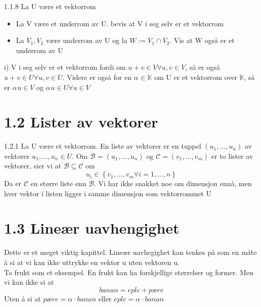 \documentclass[a4paper,norsk]{article}
\begin{document}
\begin{oppgavebox}{1.1.8}{}
La U være et vektorrom
\begin{itemize}
    \item La V være et underrom av U. bevis at V i seg selv er et vektorrom
    \item La $ V_1, V_2 $ være underrom av U og la $ W := V_1 \cap V_2 $. Vis at W også er et underrom av U   
\end{itemize}

\begin{proofbox}{i)}{}
V i seg selv er et vektorrom fordi om $ u + v \in V  \forall u, v \in V$, så er også $ u + v \in U \forall u, v \in U $. Videre er også for en $ \alpha_{}^{} \in  \mathbb{K} $ om U er et vektorrom over $ \mathbb{K} $, så er $ \alpha_{}^{} u \in V  $ og $ \alpha_{}^{} u \in U \forall u \in  V$  
\end{proofbox}
\end{oppgavebox}


\section*{1.2 Lister av vektorer}

\begin{definitionbox}{1.2.1}{}
La U være et vektorrom. En liste av vektorer er en tuppel $ \left( u_1, ..., u_n \right)  $ av vektorer $ u_1, ..., u_n \in U $. Om $ \mathcal{B}= \left( u_1, ..., u_n \right)  $ og $ \mathcal{C} = \left( v_1, ..., v_m \right)  $ er to lister av vektorer, sier vi at $ \mathcal{B} \subseteq \mathcal{C} $ om 
\[
    u_i \in \left\{ v_1, ..., v_m  \forall i = 1, ..., n \right\} 
\]
Da er $ \mathcal{C} $ en større liste enn $ \mathcal{B} $. Vi har ikke snakket noe om dimensjon ennå, men hver vektor i listen ligger i samme dimensjon som vektorrommet U
\end{definitionbox}

\section*{1.3 Lineær uavhengighet}

Dette er et meget viktig kapittel. Lineær uavhegighet kan tenkes på som en måte å si at vi kan ikke uttrykke en vektor u uten vektoren u.\\

Ta frukt som et eksempel. En frukt kan ha forskjellige størrelser og former. Men vi kan ikke si at 
\[
    banan = eple + pære
\]
Uten å si at $ pære = \alpha_{}^{} \cdot banan $ eller $ eple = \alpha_{}^{} \cdot banan $ 
 
\end{document}
